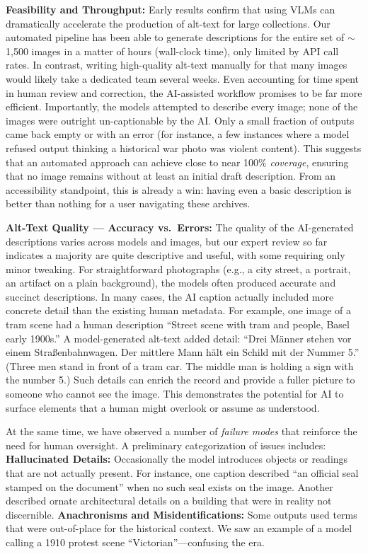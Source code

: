\documentclass{anthology-ch}         %
\begin{document}
\textbf{Feasibility and Throughput:} Early results confirm that using VLMs can dramatically accelerate the production of alt-text for large collections. Our automated pipeline has been able to generate descriptions for the entire set of $\sim$1,500 images in a matter of hours (wall-clock time), only limited by API call rates. In contrast, writing high-quality alt-text manually for that many images would likely take a dedicated team several weeks. Even accounting for time spent in human review and correction, the AI-assisted workflow promises to be far more efficient. Importantly, the models attempted to describe every image; none of the images were outright un-captionable by the AI. Only a small fraction of outputs came back empty or with an error (for instance, a few instances where a model refused output thinking a historical war photo was violent content). This suggests that an automated approach can achieve close to near 100\% \emph{coverage}, ensuring that no image remains without at least an initial draft description. From an accessibility standpoint, this is already a win: having even a basic description is better than nothing for a user navigating these archives.

\textbf{Alt-Text Quality --- Accuracy vs.\ Errors:} The quality of the AI-generated descriptions varies across models and images, but our expert review so far indicates a majority are quite descriptive and useful, with some requiring only minor tweaking. For straightforward photographs (e.g., a city street, a portrait, an artifact on a plain background), the models often produced accurate and succinct descriptions. In many cases, the AI caption actually included more concrete detail than the existing human metadata. For example, one image of a tram scene had a human description ``Street scene with tram and people, Basel early 1900s.'' A model-generated alt-text added detail: ``Drei Männer stehen vor einem Straßenbahnwagen. Der mittlere Mann hält ein Schild mit der Nummer 5.'' (Three men stand in front of a tram car. The middle man is holding a sign with the number 5.) Such details can enrich the record and provide a fuller picture to someone who cannot see the image. This demonstrates the potential for AI to surface elements that a human might overlook or assume as understood.

At the same time, we have observed a number of \emph{failure modes} that reinforce the need for human oversight. A preliminary categorization of issues includes: \textbf{Hallucinated Details:} Occasionally the model introduces objects or readings that are not actually present. For instance, one caption described ``an official seal stamped on the document'' when no such seal exists on the image. Another described ornate architectural details on a building that were in reality not discernible. \textbf{Anachronisms and Misidentifications:} Some outputs used terms that were out-of-place for the historical context. We saw an example of a model calling a 1910 protest scene ``Victorian''---confusing the era.
\end{document}
